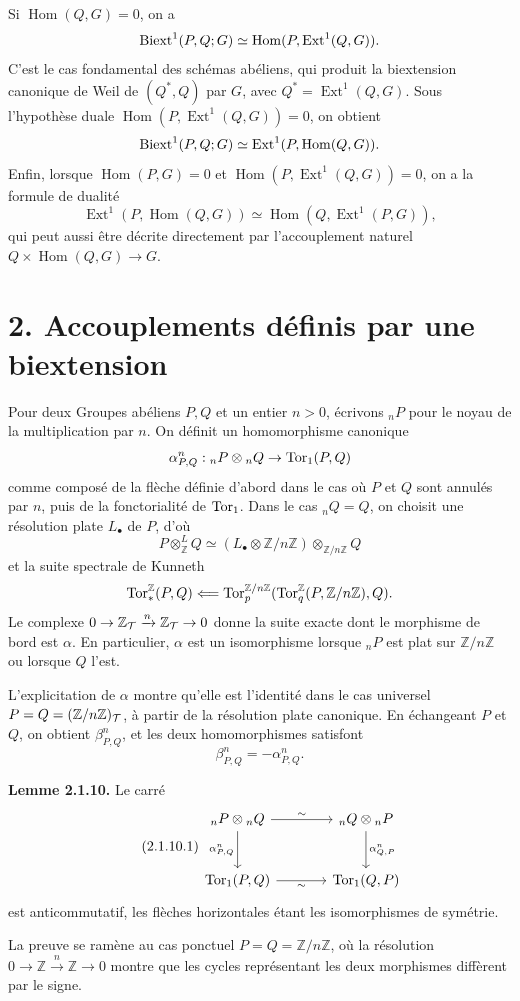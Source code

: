 \documentclass[11pt]{article}
\providecommand{\Hom}{\operatorname{Hom}}
\providecommand{\Ext}{\operatorname{Ext}}
\begin{document}
Si \(\Hom(Q,G)=0\), on a
\[
        \Biext^1(P,Q;G)\simeq\Hom(P,\Ext^1(Q,G)).
\]
C'est le cas fondamental des schémas abéliens, qui produit la biextension canonique de Weil de \((Q^*,Q)\) par \(G\), avec \(Q^*=\Ext^1(Q,G)\).  Sous l'hypothèse duale \(\Hom(P,\Ext^1(Q,G))=0\), on obtient
\[
        \Biext^1(P,Q;G)\simeq \Ext^1(P,\Hom(Q,G)).
\]
Enfin, lorsque \(\Hom(P,G)=0\) et \(\Hom(P,\Ext^1(Q,G))=0\), on a la formule de dualité
\[
        \Ext^1(P,\Hom(Q,G))\simeq\Hom(Q,\Ext^1(P,G)),
\]
qui peut aussi être décrite directement par l'accouplement naturel \(Q\times\Hom(Q,G)\to G\).

\section*{2. Accouplements définis par une biextension}

Pour deux Groupes abéliens \(P,Q\) et un entier \(n>0\), écrivons \({}_nP\) pour le noyau de la multiplication par \(n\).  On définit un homomorphisme canonique
\[
        \alpha^n_{P,Q}:{}_nP\otimes{}_nQ\to\operatorname{Tor}_1(P,Q)
\]
comme composé de la flèche définie d'abord dans le cas où \(P\) et \(Q\) sont annulés par \(n\), puis de la fonctorialité de \(\operatorname{Tor}_1\).  Dans le cas \({}_nQ=Q\), on choisit une résolution plate \(L_\bullet\) de \(P\), d'où
\[
        P\otimes^L_{\mathbb Z}Q\simeq
        (L_\bullet\otimes\mathbb Z/n\mathbb Z)\otimes_{\mathbb Z/n\mathbb Z}Q
\]
et la suite spectrale de Kunneth
\[
        \operatorname{Tor}_*^{\mathbb Z}(P,Q)
        \Longleftarrow
        \operatorname{Tor}_p^{\mathbb Z/n\mathbb Z}(\operatorname{Tor}_q^{\mathbb Z}(P,\mathbb Z/n\mathbb Z),Q).
\]
Le complexe \(0\to\mathbb Z_\mathcal T\xrightarrow{n}\mathbb Z_\mathcal T\to0\) donne la suite exacte dont le morphisme de bord est \(\alpha\).  En particulier, \(\alpha\) est un isomorphisme lorsque \({}_nP\) est plat sur \(\mathbb Z/n\mathbb Z\) ou lorsque \(Q\) l'est.

L'explicitation de \(\alpha\) montre qu'elle est l'identité dans le cas universel \(P=Q=(\mathbb Z/n\mathbb Z)_\mathcal T\), à partir de la résolution plate canonique.  En échangeant \(P\) et \(Q\), on obtient \(\beta^n_{P,Q}\), et les deux homomorphismes satisfont
\[
        \beta^n_{P,Q}=-\alpha^n_{P,Q}.
\]

\textbf{Lemme 2.1.10.}  Le carré
\begin{equation}\tag{2.1.10.1}
\begin{tikzcd}[column sep=large,row sep=large]
{}_nP\otimes{}_nQ \arrow[r,"\sim"] \arrow[d,"\alpha^n_{P,Q}"']
  & {}_nQ\otimes{}_nP \arrow[d,"\alpha^n_{Q,P}"]\\
\Torop_1(P,Q) \arrow[r,"\sim"'] & \Torop_1(Q,P)
\end{tikzcd}
\end{equation}
est anticommutatif, les flèches horizontales étant les isomorphismes de symétrie.

La preuve se ramène au cas ponctuel \(P=Q=\mathbb Z/n\mathbb Z\), où la résolution \(0\to\mathbb Z\xrightarrow{n}\mathbb Z\to0\) montre que les cycles représentant les deux morphismes diffèrent par le signe.
\end{document}
